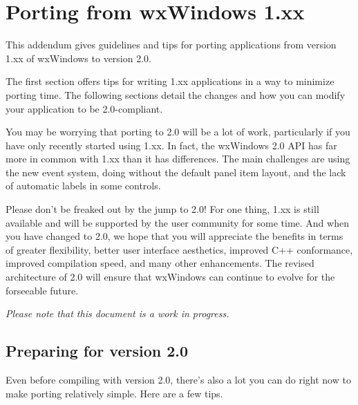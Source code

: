 \chapter{Porting from wxWindows 1.xx}\label{porting}

This addendum gives guidelines and tips for porting applications from
version 1.xx of wxWindows to version 2.0.

The first section offers tips for writing 1.xx applications in a way to
minimize porting time. The following sections detail the changes and
how you can modify your application to be 2.0-compliant.

You may be worrying that porting to 2.0 will be a lot of work,
particularly if you have only recently started using 1.xx. In fact,
the wxWindows 2.0 API has far more in common with 1.xx than it has differences.
The main challenges are using the new event system, doing without the default
panel item layout, and the lack of automatic labels in some controls.

Please don't be freaked out by the jump to 2.0! For one thing, 1.xx is still available
and will be supported by the user community for some time. And when you have
changed to 2.0, we hope that you will appreciate the benefits in terms
of greater flexibility, better user interface aesthetics, improved C++ conformance,
improved compilation speed, and many other enhancements. The revised architecture
of 2.0 will ensure that wxWindows can continue to evolve for the forseeable
future.

{\it Please note that this document is a work in progress.}

\section{Preparing for version 2.0}\label{portingpreparing}

Even before compiling with version 2.0, there's also a lot you can do right now to make porting
relatively simple. Here are a few tips.

